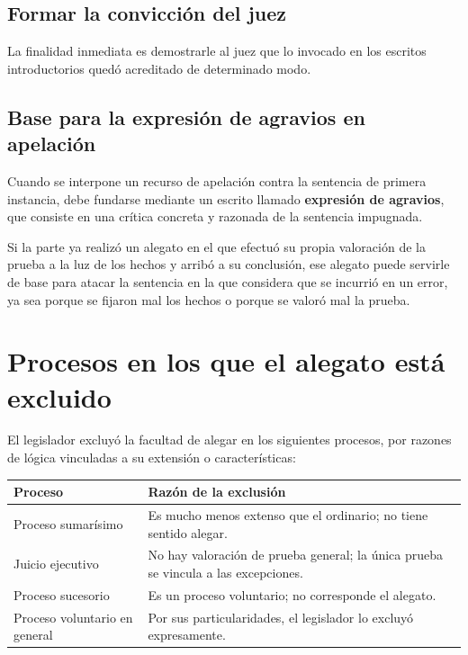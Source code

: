 \documentclass[12pt,oneside]{book}
\begin{document}
\subsection{Formar la convicción del juez}

La finalidad inmediata es demostrarle al juez que lo invocado en los escritos introductorios quedó acreditado de determinado modo.

\subsection{Base para la expresión de agravios en apelación}

Cuando se interpone un recurso de apelación contra la sentencia de primera instancia, debe fundarse mediante un escrito llamado \textbf{expresión de agravios}, que consiste en una crítica concreta y razonada de la sentencia impugnada.

Si la parte ya realizó un alegato en el que efectuó su propia valoración de la prueba a la luz de los hechos y arribó a su conclusión, ese alegato puede servirle de base para atacar la sentencia en la que considera que se incurrió en un error, ya sea porque se fijaron mal los hechos o porque se valoró mal la prueba.

\section{Procesos en los que el alegato está excluido}

El legislador excluyó la facultad de alegar en los siguientes procesos, por razones de lógica vinculadas a su extensión o características:

\begin{table}[H]
\centering
\begin{tabularx}{\textwidth}{>{\raggedright\arraybackslash}p{4.2cm} >{\raggedright\arraybackslash}X}
\toprule
\textbf{Proceso} & \textbf{Razón de la exclusión} \\
\midrule
Proceso sumarísimo & Es mucho menos extenso que el ordinario; no tiene sentido alegar. \\
Juicio ejecutivo & No hay valoración de prueba general; la única prueba se vincula a las excepciones. \\
Proceso sucesorio & Es un proceso voluntario; no corresponde el alegato. \\
Proceso voluntario en general & Por sus particularidades, el legislador lo excluyó expresamente. \\
\bottomrule
\end{tabularx}
\end{table}
\end{document}
